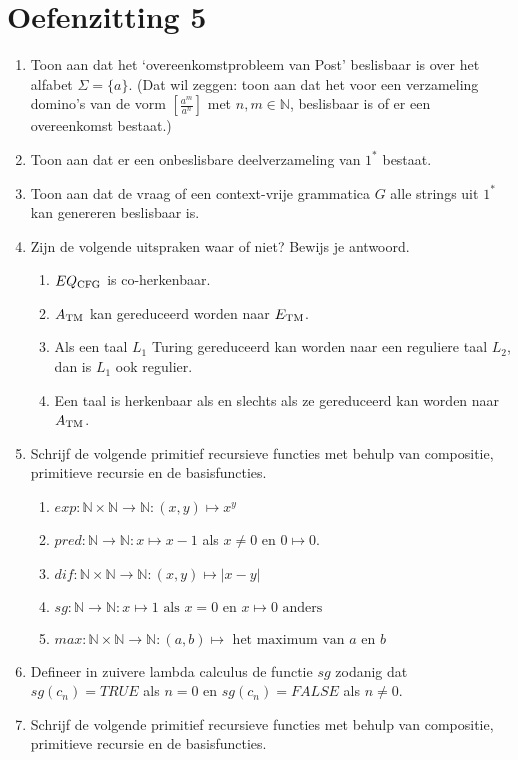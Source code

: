 \documentclass[a4paper]{article}
\newcommand{\N}{\mathbb{N}}
\begin{document}
\pagestyle{empty}

\section*{Oefenzitting 5}


\begin{enumerate}
   \item Toon aan dat het `overeenkomstprobleem van Post' beslisbaar is over het alfabet $\Sigma = \{ a \}$. (Dat wil zeggen: toon aan dat het voor een verzameling domino's van de vorm $\left[ \frac{a^m}{a^n} \right]$ met $n,m \in \mathbb{N}$, beslisbaar is of er een overeenkomst bestaat.) 
\item Toon aan dat er een onbeslisbare deelverzameling van $1^*$ bestaat.
 \item Toon aan dat de vraag of een context-vrije grammatica $G$ alle strings uit $1^*$ kan genereren beslisbaar is.
 \item Zijn de volgende uitspraken waar of niet? Bewijs je antwoord.
		   \begin{enumerate}
			   \item $EQ_{\rm CFG}$ is co-herkenbaar.
				\item $A_{\rm TM}$ kan gereduceerd worden naar $E_{\rm TM}$.
				\item Als een taal $L_1$ Turing gereduceerd kan worden naar een reguliere taal $L_2$, dan is $L_1$ ook regulier.
				\item Een taal is herkenbaar als en slechts als ze gereduceerd kan worden naar $A_{\rm TM}$.
			\end{enumerate}
	\item Schrijf de volgende primitief recursieve functies met behulp van compositie, primitieve recursie en de basisfuncties.
			\begin{enumerate}
				\item $exp : \N \times \N \to \N : (x,y) \mapsto x^y$
				\item $pred : \N \to \N : x \mapsto x - 1$ als $x \neq 0$ en $0 \mapsto 0$.
				\item $dif : \N \times \N \to \N : (x,y) \mapsto | x - y |$
				\item $sg : \mathbb{N} \to \mathbb{N} : x \mapsto 1 \text{ als $x = 0$ en $x \mapsto 0$ anders}$
				\item $max : \mathbb{N} \times \mathbb{N} \to \mathbb{N} : (a,b) \mapsto \text{ het maximum van $a$ en $b$}$
			\end{enumerate}
   \item Defineer in zuivere lambda calculus de functie $sg$ zodanig dat $sg(c_n) = TRUE$ als $n = 0$ en $sg(c_n) = FALSE$ als $n \neq 0$.
   \item Schrijf de volgende primitief recursieve functies met behulp van compositie, primitieve recursie en de basisfuncties.
\end{enumerate}
\end{document}
